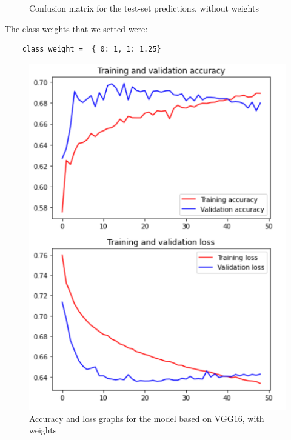 \documentclass[11pt,a4paper,oneside]{article}
\begin{document}
\begin{figure}[h]
\begin{minipage}[c]{.4\textwidth}
		\caption{Confusion matrix for the test-set predictions, without weights}
		\label{fig:vgg16_3.2_matrix}
	\end{minipage}%
\end{figure}

The class weights that we setted were: 
\begin{verbatim}
    class_weight =  { 0: 1, 1: 1.25}
\end{verbatim}

\begin{figure}[h]
\centering
	\begin{minipage}[c]{.4\textwidth}
		\centering\setlength{\captionmargin}{0pt}%
		\includegraphics[width=.9\textwidth]{images/Task 3/VGG16 3.2/With Weights/Accuracy}
		\caption{Accuracy and loss graphs for the model based on VGG16, with weights}
		\label{fig:vgg16_3.2_accuracy}
	\end{minipage}
	\hspace{5mm}%
	\begin{minipage}[c]{.4\textwidth}
		\centering\setlength{\captionmargin}{0pt}%

\end{minipage}
\end{figure}
\end{document}
